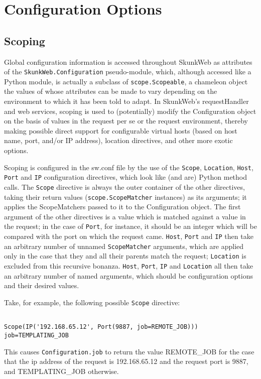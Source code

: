\documentclass[titlepage]{manual}
\begin{document}
\section{Configuration Options}

\subsection{Scoping}
Global configuration information is accessed throughout SkunkWeb as attributes of the 
\texttt{SkunkWeb.Configuration} pseudo-module, which, although accessed like a Python module,
is actually a subclass of \texttt{scope.Scopeable}, a chameleon object the values of whose attributes can be 
made to vary depending on the environment to which it has been told to adapt.
In SkunkWeb's requestHandler and web services, scoping is used to (potentially) modify the Configuration
object on the basis of values in the request per se or the request environment, thereby making possible
direct support for configurable virtual hosts (based on host name, port, and/or IP address), 
location directives, and other more exotic options.

Scoping is configured in the sw.conf file by the use of the \texttt{Scope}, \texttt{Location}, \texttt{Host}, 
\texttt{Port} and \texttt{IP} configuration directives, which look like (and are) Python method calls.  The 
\texttt{Scope} directive 
is always the outer container of the other directives, taking their return values (\texttt{scope.ScopeMatcher}
instances) as its arguments; it applies the ScopeMatchers passed to it to the Configuration object.  
The first argument of the other directives is a value which is matched against a value 
in the request; in the case of \texttt{Port}, for instance, it should be an integer which will be 
compared with the 
port on which the request came.  \texttt{Host}, \texttt{Port} and \texttt{IP} then take an arbitrary 
number of unnamed \texttt{ScopeMatcher}
arguments, which are applied only in the case that they and all their parents match the request; 
\texttt{Location} is excluded from this recursive bonanza.  
\texttt{Host}, \texttt{Port}, \texttt{IP} and \texttt{Location} all then take an arbitrary 
number of named arguments, which should be configuration options and their desired values.

Take, for example, the following possible \texttt{Scope} directive:

\begin{verbatim}

Scope(IP('192.168.65.12', Port(9887, job=REMOTE_JOB)))
job=TEMPLATING_JOB

\end{verbatim}
This causes \texttt{Configuration.job} to return the value REMOTE_JOB for the case that the ip address of the 
request is 192.168.65.12 and the request port is 9887, and TEMPLATING_JOB otherwise.
 
\end{document}
